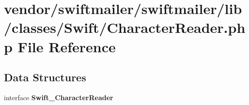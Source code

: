 \section{vendor/swiftmailer/swiftmailer/lib/classes/\+Swift/\+Character\+Reader.php File Reference}
\label{_character_reader_8php}
\subsection*{Data Structures}
\begin{DoxyCompactItemize}
\item 
interface {\bf Swift\+\_\+\+Character\+Reader}
\end{DoxyCompactItemize}
